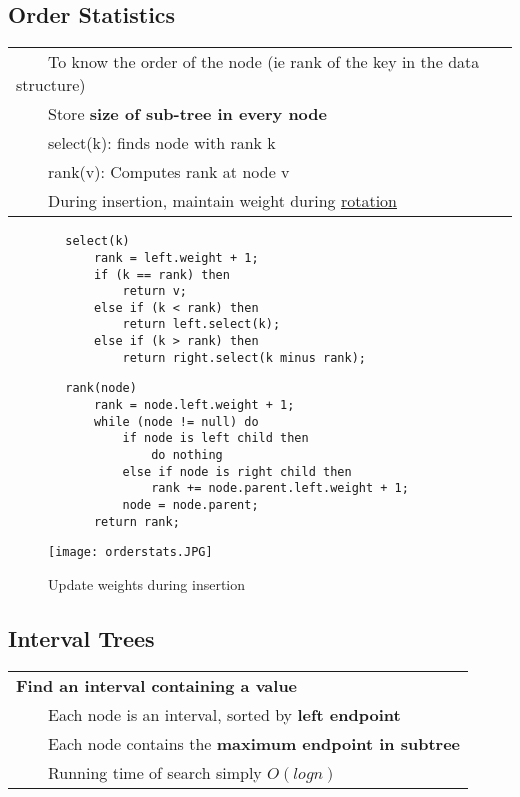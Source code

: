 \documentclass{article}
\newcommand{\tabitem}{~~\llap{\textbullet}~~}
\begin{document}
    \subsection{Order Statistics}

    \begin{tabular}{l}
        \tabitem To know the order of the node (ie rank of the key in the data structure)\\
        \tabitem Store \textbf{size of sub-tree in every node}\\
        \tabitem select(k): finds node with rank k\\
        \tabitem rank(v): Computes rank at node v\\
        \tabitem During insertion, maintain weight during \hyperref[orderstats]{rotation}
    \end{tabular}

    \begin{verbatim}
        select(k)
            rank = left.weight + 1;
            if (k == rank) then
                return v;
            else if (k < rank) then
                return left.select(k);
            else if (k > rank) then
                return right.select(k minus rank);
    \end{verbatim}

    \begin{verbatim}
        rank(node)
            rank = node.left.weight + 1;
            while (node != null) do
                if node is left child then
                    do nothing
                else if node is right child then
                    rank += node.parent.left.weight + 1;
                node = node.parent;
            return rank;
    \end{verbatim}

    \begin{figure}[htbp]
        \begin{center}
        \texttt{[image: orderstats.JPG]}
        \caption{Update weights during insertion}
        \label{orderstats}
        \end{center}
    \end{figure}

    \pagebreak

    \subsection{Interval Trees}

    \begin{tabular}{l}
        \textbf{Find an interval containing a value}\\
        \tabitem Each node is an interval, sorted by \textbf{left endpoint}\\
        \tabitem Each node contains the \textbf{maximum endpoint in subtree}\\
        \tabitem Running time of search simply $O(logn)$\\
    \end{tabular}
\end{document}
